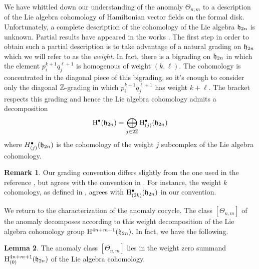 \documentclass[11pt, oneside, reqno]{amsart}
\theoremstyle{definition} \newtheorem{definition}{Definition}[section]
\newtheorem{lemma}[definition]{Lemma}
\theoremstyle{definition}
\theoremstyle{remark}
\theoremstyle{definition} \newtheorem{remark}[definition]{Remark}
\theoremstyle{definition} \newtheorem{remarks}[definition]{Remarks}
\theoremstyle{definition} \newtheorem{question}[definition]{Question}
\theoremstyle{definition} \newtheorem*{note}{Note}
\theoremstyle{definition} \newtheorem{example}[definition]{Example}
\theoremstyle{definition} \newtheorem{examples}[definition]{Examples}
\def\bu{\bullet}
\newcommand{\mr}[1]{\mathrm{#1}}
\newcommand{\ham}{/\!\!/}
\def\ham{\fh}
\begin{document}
We have whittled down our understanding of the anomaly $\Theta_{n,m}$ to a description of the Lie algebra cohomology of Hamiltonian vector fields on the formal disk.
Unfortunately, a complete description of the cohomology of the Lie algebra $\ham_{2n}$ is unknown. Partial results have appeared in the works \cite{GKF, GuilleminShnider, Perchik, Kontsevich}. The first step in order to obtain such a partial description is to take advantage of a natural grading on $\mathfrak h_{2n}$ which we will refer to as the {\em weight}.  In fact, there is a bigrading on $\mathfrak h_{2n}$ in which the element $p_i^{k+1} q_j^{\ell+1}$ is homogenous of weight $(k, \ell)$.  The cohomology is concentrated in the diagonal piece of this bigrading, so it's enough to consider only the diagonal $\mathbb Z$-grading in which $p_i^{k+1} q_j^{\ell+1}$ has weight $k + \ell$.  
The bracket respects this grading and hence the Lie algebra cohomology admits a decomposition
\[
\mr H^\bu(\fh_{2n}) = \bigoplus_{j \in 2\ZZ} \mr H^\bu_{(j)} (\fh_{2n}) 
\]
where $H^\bu_{(j)} (\fh_{2n})$ is the cohomology of the weight $j$ subcomplex of the Lie algebra cohomology.

\begin{remark}
Our grading convention differs slightly from the one used in the reference \cite{GKF}, but agrees with the convention in \cite{Perchik}.
For instance, the weight $k$ cohomology, as defined in \cite{GKF}, agrees with $\mr H^\bu_{(2k)}(\fh_{2n})$ in our convention. 
\end{remark}

We return to the characterization of the anomaly cocycle.
The class $[\Theta_{n,m}]$ of the anomaly decomposes according to this weight decomposition of the Lie algebra cohomology group $\mr H^{4n+m+1}(\fh_{2n})$. 
In fact, we have the following.

\begin{lemma} \label{weight_lemma}
The anomaly class $[\Theta_{n,m}]$ lies in the weight zero summand $\mr H_{(0)}^{4n+m+1}(\fh_{2n})$ of the Lie algebra cohomology. 
\end{lemma}
\end{document}
